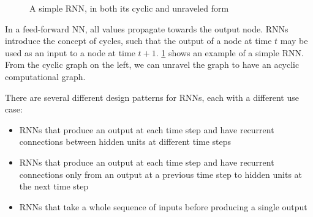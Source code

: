 \documentclass[12pt,a4paper,twoside,openright]{report}
\begin{document}
\begin{figure}[H]
\centering
{}
\caption[A simple RNN, in both its cyclic and unraveled form]{A simple RNN, in both its cyclic and unraveled form\footnotemark}
\label{fig:RNN}
\end{figure}


In a feed-forward NN, all values propagate
towards the output node. RNNs introduce the concept of cycles, such
that the output of a node at time $t$ may be used as an input to a node at time $t+1$. \cref{fig:RNN}
shows an example of a simple RNN. From the cyclic graph on the left, we can unravel the graph
to have an acyclic computational graph.

There are several different design patterns for RNNs, each with a different use case:
\begin{itemize}
	\item
	RNNs that produce an output at each time step and have recurrent connections between hidden units
	at different time steps
	
	\item
	RNNs that produce an output at each time step and have recurrent connections only from an output
	at a previous time step to hidden units at the next time step
	
	\item
	RNNs that take a whole sequence of inputs before producing a single output
\end{itemize}
\end{document}
